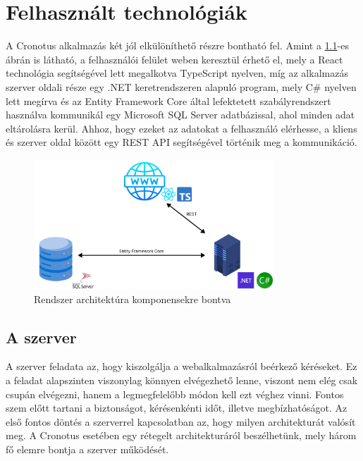\lstset{style=c_sharp}

\chapter{Felhasznált technológiák}


A Cronotus alkalmazás két jól elkülöníthető részre bontható fel. Amint a \ref{fig:architecture_overview}-es ábrán is látható, a felhasználói felület weben keresztül érhető el, mely a React technológia segítségével lett megalkotva TypeScript nyelven, míg az alkalmazás szerver oldali része egy .NET keretrendszeren alapuló program, mely C\# nyelven lett megírva és az Entity Framework Core által lefektetett szabályrendszert használva kommunikál egy Microsoft SQL Server adatbázissal, ahol minden adat eltárolásra kerül.
Ahhoz, hogy ezeket az adatokat a felhasználó elérhesse, a kliens és szerver oldal között egy REST API segítségével történik meg a kommunikáció.

\begin{figure}[h]
    \centering
    \includegraphics[width=0.8\textwidth]{./images/cronotus_architecture_overview.png}
    \caption{Rendszer architektúra komponensekre bontva}
    \label{fig:architecture_overview}
\end{figure}


\section{A szerver}

A szerver feladata az, hogy kiszolgálja a webalkalmazásról beérkező kéréseket. Ez a feladat alapszinten viszonylag könnyen elvégezhető lenne, viszont nem elég csak csupán elvégezni, hanem a legmegfelelőbb módon kell ezt véghez vinni. Fontos szem előtt tartani a biztonságot, kérésenkénti időt, illetve megbízhatóságot. Az első fontos döntés a szerverrel kapcsolatban az, hogy milyen architekturát valósít meg. A Cronotus esetében egy rétegelt architekturáról beszélhetünk, mely három fő elemre bontja a szerver működését.

